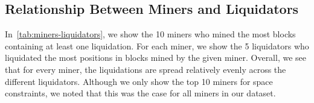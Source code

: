 \subsection{Relationship Between Miners and Liquidators}
\label{sec:miners-liquidators}
In~\autoref{tab:miners-liquidators}, we show the 10 miners who mined the most blocks containing at least one liquidation.
For each miner, we show the 5 liquidators who liquidated the most positions in blocks mined by the given miner.
Overall, we see that for every miner, the liquidations are spread relatively evenly across the different liquidators.
Although we only show the top 10 miners for space constraints, we noted that this was the case for all miners in our dataset.


\hypersetup{hidelinks}
\renewcommand{\contractaddr}[2][\ssmall]{{#1\href{https://etherscan.io/token/#2}{\texttt{#2}}}}
